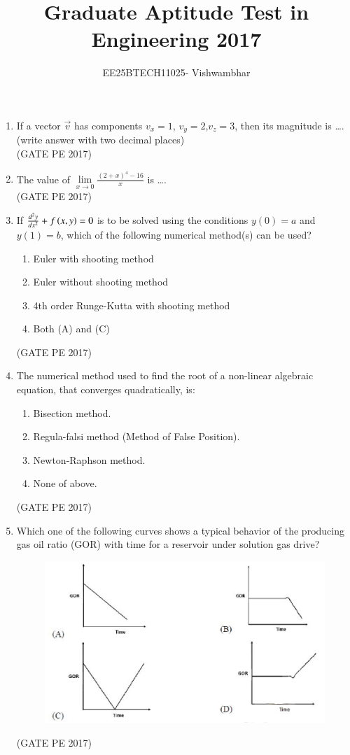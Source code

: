 \documentclass[journal,12pt,onecolumn]{IEEEtran}
\title{Graduate Aptitude Test in Engineering 2017}
\author{EE25BTECH11025- Vishwambhar}
\theoremstyle{remark}
\begin{document}
\maketitle

\begin{enumerate}
 
\item If a vector $\vec{v}$ has components $v_x = 1$, $v_y = 2$,$v_z = 3$, then its magnitude is \dots.\\
(write answer with two decimal places)\\

\hfill{(GATE PE 2017)}

\item The value of $\lim\limits_{x \to 0} \frac{(2 + x)^4 - 16}{x} $ is \dots.\\

\hfill{(GATE PE 2017)}

\item If $\frac{d^2 y}{dx^2} + f\left(x, y\right) = 0$ is to be solved using the conditions $y(0) = a$ and $y(1) = b$, which of the following numerical method(s) can be used?
\begin{enumerate}
\item Euler with shooting method
\item Euler without shooting method
\item 4th order Runge-Kutta with shooting method
\item Both (A) and (C)
\end{enumerate}
\hfill{(GATE PE 2017)}

\item The numerical method used to find the root of a non-linear algebraic equation, that converges quadratically, is:
\begin{enumerate}
\item Bisection method.
\item Regula-falsi method (Method of False Position).
\item Newton-Raphson method.
\item None of above.
\end{enumerate}
\hfill{(GATE PE 2017)}

\item Which one of the following curves shows a typical behavior of the producing gas oil ratio (GOR) with time for a reservoir under solution gas drive?
\begin{figure}[h]
    \centering
    \includegraphics[width=0.5\columnwidth]{GraphQ _5.png}
    \caption{}
    \label{fig:placeholder}
\end{figure}
\hfill{(GATE PE 2017)}


\end{enumerate}
\end{document}
